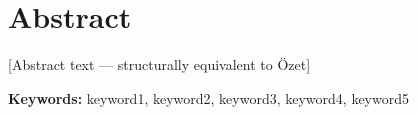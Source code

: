 \chapter*{Abstract}
[Abstract text — structurally equivalent to Özet]
\par\noindent\textbf{Keywords:} keyword1, keyword2, keyword3, keyword4, keyword5
